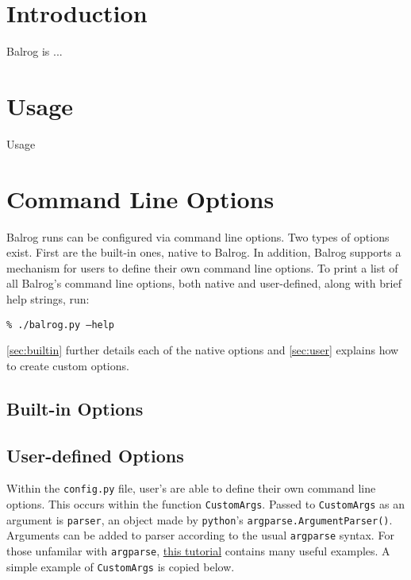\documentclass[12pt]{article}
\newcommand{\balrog}{Balrog}
\newcommand{\opt}[1]{\texttt{--#1}}
\newcommand{\bcmd}[1]{\vspace{6pt} \noindent \texttt{\% ./balrog.py #1} \vspace{6pt}}
\begin{document}
\balrogtitlepage

\newpage
\tableofcontents

\newpage
\section{Introduction}
\label{sec:intro}
\balrog{} is ...

\section{Usage}
Usage

\section{Command Line Options}
\balrog{} runs can be configured via command line options.
Two types of options exist. First are the built-in
ones, native to \balrog{}. In addition, \balrog{}
supports a mechanism for users to define their
own command line options.
To print a list of all \balrog{}'s command line options,
both native and user-defined, along with
brief help strings, run:

\bcmd{\opt{help}}

\noindent \autoref{sec:builtin} further details each
of the native options and \autoref{sec:user}
explains how to create custom options.

\subsection{Built-in Options}
\label{sec:builtin}

\optstab{}

\subsection{User-defined Options}
\label{sec:user}

Within the \texttt{config.py} file, user's are able to
define their own command line options. This occurs
within the function \texttt{CustomArgs}. Passed
to \texttt{CustomArgs} as an argument is \texttt{parser},
an object made by \texttt{python}'s
\texttt{argparse.ArgumentParser()}. Arguments
can be added to parser according to the usual
\texttt{argparse} syntax.
For those unfamilar with \texttt{argparse},
\href{http://docs.python.org/2/howto/argparse.html}{this tutorial}
contains many useful examples. A simple example of
\texttt{CustomArgs} is copied below.
\end{document}
